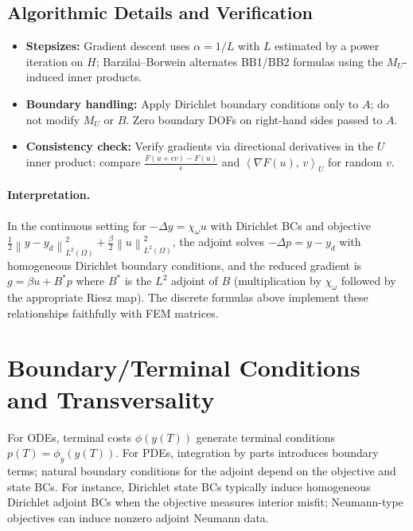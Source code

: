 \documentclass[11pt,a4paper]{article}
\numberwithin{equation}{section}
\theoremstyle{plain}
\theoremstyle{definition}
\newcommand{\ip}[2]{\left\langle #1,\,#2 \right\rangle}
\newcommand{\norm}[1]{\left\lVert #1 \right\rVert}
\begin{document}
\subsection{Algorithmic Details and Verification}
\begin{itemize}
  \item \textbf{Stepsizes:} Gradient descent uses $\alpha=1/L$ with $L$ estimated by a power iteration on $H$; Barzilai--Borwein alternates BB1/BB2 formulas using the $M_U$-induced inner products.
  \item \textbf{Boundary handling:} Apply Dirichlet boundary conditions only to $A$; do not modify $M_U$ or $B$. Zero boundary DOFs on right-hand sides passed to $A$.
  \item \textbf{Consistency check:} Verify gradients via directional derivatives in the $U$ inner product: compare $\frac{F(u+\epsilon v)-F(u)}{\epsilon}$ and $\ip{\nabla F(u)}{v}_U$ for random $v$.
\end{itemize}

\paragraph{Interpretation.} In the continuous setting for $-\Delta y = \chi_\omega u$ with Dirichlet BCs and objective $\tfrac{1}{2}\norm{y-y_d}_{L^2(\Omega)}^2 + \tfrac{\beta}{2}\norm{u}_{L^2(\Omega)}^2$, the adjoint solves $-\Delta p = y - y_d$ with homogeneous Dirichlet boundary conditions, and the reduced gradient is $g = \beta u + B^\ast p$ where $B^\ast$ is the $L^2$ adjoint of $B$ (multiplication by $\chi_\omega$ followed by the appropriate Riesz map). The discrete formulas above implement these relationships faithfully with FEM matrices.

\section{Boundary/Terminal Conditions and Transversality}
For ODEs, terminal costs $\phi(y(T))$ generate terminal conditions $p(T)=\phi_y(y(T))$. For PDEs, integration by parts introduces boundary terms; natural boundary conditions for the adjoint depend on the objective and state BCs. For instance, Dirichlet state BCs typically induce homogeneous Dirichlet adjoint BCs when the objective measures interior misfit; Neumann-type objectives can induce nonzero adjoint Neumann data.
\end{document}

